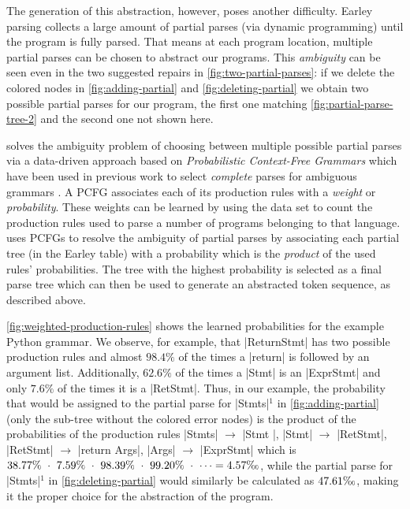 %
The generation of this abstraction, however,
poses another difficulty.
%
Earley parsing collects a large amount of partial
parses (via dynamic programming) until the program
is fully parsed.
%
That means at each program location, multiple
partial parses can be chosen to abstract our programs.
%
This \emph{ambiguity} can be seen even in the two
suggested repairs in \autoref{fig:two-partial-parses}:
if we delete the colored nodes in \autoref{fig:adding-partial} and
\autoref{fig:deleting-partial} we obtain two possible partial parses for our
program, the first one matching \autoref{fig:partial-parse-tree-2} and the
second one not shown here.

%
\toolname solves the ambiguity problem
of choosing between multiple possible
partial parses via a data-driven approach
based on \emph{Probabilistic Context-Free Grammars}
which have been used in previous work
to select \emph{complete} parses for
ambiguous grammars \citep{Collins_2013, Jelinek_1992}.
%
A PCFG associates each of its production rules with a
\emph{weight} or \emph{probability}.
%
These weights can be learned \citep{Collins_2013}
by using the data set to count the production rules
used to parse a number of programs belonging to that
language.
%
\toolname uses PCFGs to resolve the ambiguity of
partial parses by associating each partial tree
(in the Earley table) with a probability which
is the \emph{product} of the used rules' probabilities.
%
The tree with the highest probability is selected
as a final parse tree which can then be used to
generate an abstracted token sequence, as described above.


\autoref{fig:weighted-production-rules} shows the
learned probabilities for the example Python grammar.
%
We observe, for example, that |ReturnStmt| has two
possible production rules and almost $98.4\%$ of the
times a |return| is followed by an argument list.
%
Additionally, $62.6\%$ of the times a |Stmt| is an
|ExprStmt| and only $7.6\%$ of the times it is a |RetStmt|.
%
Thus, in our example, the probability that would be assigned
to the partial parse for |Stmts|$^1$ in \autoref{fig:adding-partial}
(only the sub-tree without the colored error nodes) is
the product of the probabilities of the production rules |Stmts|
$\rightarrow$ |Stmt \n|, |Stmt| $\rightarrow$ |RetStmt|, |RetStmt| $\rightarrow$
|return Args|, |Args| $\rightarrow$ |ExprStmt| \etc which is $38.77\%\ \cdot\
7.59\%\ \cdot\ 98.39\%\ \cdot\ 99.20\%\ \cdot\ \dots =
4.57\text{\textperthousand}$, while the partial parse for |Stmts|$^1$ in
\autoref{fig:deleting-partial} would similarly be calculated as
$47.61\text{\textperthousand}$, making it the proper choice for
the abstraction of the program.


